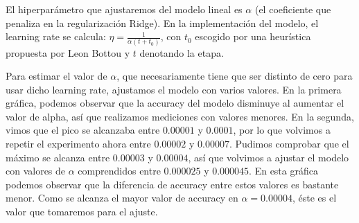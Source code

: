 \documentclass[a4]{article}
\begin{document}
El hiperparámetro que ajustaremos del modelo lineal es $\alpha$ (el coeficiente que penaliza en la regularización Ridge). En la implementación del modelo, el learning rate se calcula: $\eta = \frac{1}{\alpha (t + t_0)}$, con $t_0$ escogido por una heurística propuesta por Leon Bottou y $t$ denotando la etapa.

Para estimar el valor de $\alpha$, que necesariamente tiene que ser distinto de cero para usar dicho learning rate, ajustamos el modelo con varios valores. En la primera gráfica, podemos observar que la accuracy del modelo disminuye al aumentar el valor de alpha, así que realizamos mediciones con valores menores. En la segunda, vimos que el pico se alcanzaba entre $0.00001$ y $0.0001$, por lo que volvimos a repetir el experimento ahora entre $0.00002$ y $0.00007$. Pudimos comprobar que el máximo se alcanza entre $0.00003$ y $0.00004$, así que volvimos a ajustar el modelo con valores de $\alpha$ comprendidos entre $0.000025$ y $0.000045$. En esta gráfica podemos observar que la diferencia de accuracy entre estos valores es bastante menor. Como se alcanza el mayor valor de accuracy en $\alpha = 0.00004$, éste es el valor que tomaremos para el ajuste.
\end{document}
